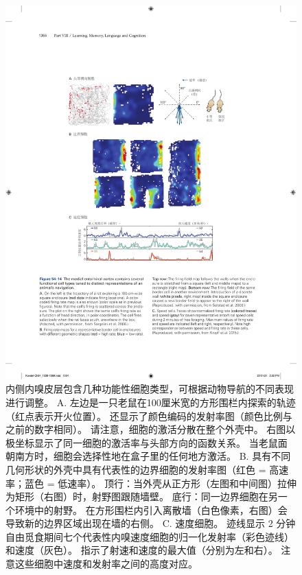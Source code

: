 \begin{figure}[htbp]
	\centering
	\includegraphics[width=0.93\linewidth]{chap54/fig_54_14}
	\caption{内侧内嗅皮层包含几种功能性细胞类型，可根据动物导航的不同表现进行调整。
		A. 左边是一只老鼠在100厘米宽的方形围栏内探索的轨迹（红点表示开火位置）。
		还显示了颜色编码的发射率图（颜色比例与之前的数字相同）。
		请注意，细胞的激活分散在整个外壳中。
		右图以极坐标显示了同一细胞的激活率与头部方向的函数关系。
		当老鼠面朝南方时，细胞会选择性地在盒子里的任何地方激活\cite{sargolini2006conjunctive}。
		B. 具有不同几何形状的外壳中具有代表性的边界细胞的发射率图（红色 = 高速率；蓝色 = 低速率）。
		顶行：当外壳从正方形（左图和中间图）拉伸为矩形（右图）时，射野图跟随墙壁。
		底行：同一边界细胞在另一个环境中的射野。
		在方形围栏内引入离散墙（白色像素，右图）会导致新的边界区域出现在墙的右侧\cite{solstad2008representation}。
		C. 速度细胞。
		迹线显示 2 分钟自由觅食期间七个代表性内嗅速度细胞的归一化发射率（彩色迹线）和速度（灰色）。
		指示了射速和速度的最大值（分别为左和右）。
		注意这些细胞中速度和发射率之间的高度对应\cite{kropff2015speed}。}
	\label{fig:54_14}
\end{figure}


